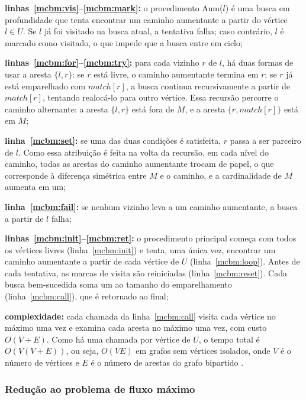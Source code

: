 \begin{alineas}
    \item \textbf{linhas~\ref{mcbm:vis}--\ref{mcbm:mark}:} o procedimento Aum($l$) é uma busca em profundidade que tenta encontrar um caminho aumentante a partir do vértice $l \in U$. Se $l$ já foi visitado na busca atual, a tentativa falha; caso contrário, $l$ é marcado como visitado, o que impede que a busca entre em ciclo;
    \item \textbf{linhas~\ref{mcbm:for}--\ref{mcbm:try}:} para cada vizinho $r$ de $l$, há duas formas de usar a aresta $\{l, r\}$: se $r$ está livre, o caminho aumentante termina em $r$; se $r$ já está emparelhado com $match[r]$, a busca continua recursivamente a partir de $match[r]$, tentando realocá-lo para outro vértice. Essa recursão percorre o caminho alternante: a aresta $\{l, r\}$ está fora de $M$, e a aresta $\{r, match[r]\}$ está em $M$;
    \item \textbf{linha~\ref{mcbm:set}:} se uma das duas condições é satisfeita, $r$ passa a ser parceiro de $l$. Como essa atribuição é feita na volta da recursão, em cada nível do caminho, todas as arestas do caminho aumentante trocam de papel, o que corresponde à diferença simétrica entre $M$ e o caminho, e a cardinalidade de $M$ aumenta em um;
    \item \textbf{linha~\ref{mcbm:fail}:} se nenhum vizinho leva a um caminho aumentante, a busca a partir de $l$ falha;
    \item \textbf{linhas~\ref{mcbm:init}--\ref{mcbm:ret}:} o procedimento principal começa com todos os vértices livres (linha~\ref{mcbm:init}) e tenta, uma única vez, encontrar um caminho aumentante a partir de cada vértice de $U$ (linha~\ref{mcbm:loop}). Antes de cada tentativa, as marcas de visita são reiniciadas (linha~\ref{mcbm:reset}). Cada busca bem-sucedida soma um ao tamanho do emparelhamento (linha~\ref{mcbm:call}), que é retornado ao final;
    \item \textbf{complexidade:} cada chamada da linha~\ref{mcbm:call} visita cada vértice no máximo uma vez e examina cada aresta no máximo uma vez, com custo $O(V + E)$. Como há uma chamada por vértice de $U$, o tempo total é $O(V(V + E))$, ou seja, $O(VE)$ em grafos sem vértices isolados, onde $V$ é o número de vértices e $E$ é o número de arestas do grafo bipartido \cite{halim}.
\end{alineas}

\subsubsection{Redução ao problema de fluxo máximo}
\label{p:reducao_fluxo_mcm}

